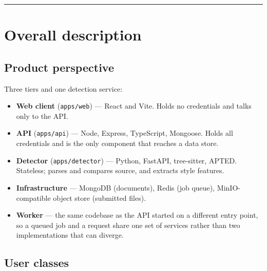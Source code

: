 \begin{center}\rule{0.5\linewidth}{0.5pt}\end{center}

\hypertarget{overall-description}{%
\section{Overall description}\label{overall-description}}

\hypertarget{product-perspective}{%
\subsection{Product perspective}\label{product-perspective}}

Three tiers and one detection service:

\begin{itemize}
\tightlist
\item
  \textbf{Web client} (\texttt{apps/web}) --- React and Vite. Holds no
  credentials and talks only to the API.
\item
  \textbf{API} (\texttt{apps/api}) --- Node, Express, TypeScript,
  Mongoose. Holds all credentials and is the only component that reaches
  a data store.
\item
  \textbf{Detector} (\texttt{apps/detector}) --- Python, FastAPI,
  tree-sitter, APTED. Stateless; parses and compares source, and
  extracts style features.
\item
  \textbf{Infrastructure} --- MongoDB (documents), Redis (job queue),
  MinIO-compatible object store (submitted files).
\item
  \textbf{Worker} --- the same codebase as the API started on a
  different entry point, so a queued job and a request share one set of
  services rather than two implementations that can diverge.
\end{itemize}

\hypertarget{user-classes}{%
\subsection{User classes}\label{user-classes}}

